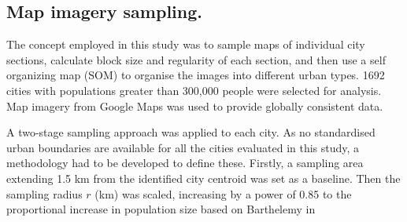 \documentclass{nature}
\begin{document}
\begin{methods}
%
%





\subsection{Map imagery sampling.}\label{sec:methods2}
The concept employed in this study was to sample maps of individual city sections, calculate block size and regularity of each section, and then use a self organizing map (SOM) to organise the images into different urban types. 1692 cities with populations greater than 300,000 people\cite{UN2014} were selected for analysis. Map imagery from Google Maps\cite{GoogleStatic2017} was used to provide globally consistent data. 

A two-stage sampling approach was applied to each city. As no standardised urban boundaries are available for all the cities evaluated in this study, a methodology had to be developed to define these. Firstly, a sampling area extending 1.5 km from the identified city centroid\cite{UN2014} was set as a baseline. Then the sampling radius $r$ (km) was scaled, increasing by a power of 0.85 to the proportional increase in population size based on Barthelemy\cite{Barthelemy2016} in 


\end{methods}
\end{document}
